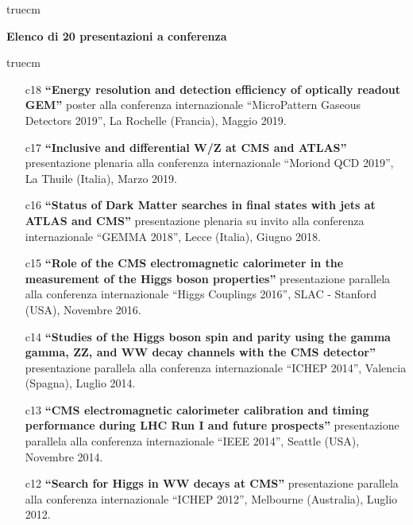 \documentclass[11pt,twoside,a4paper]{article}
\begin{document}
 truecm
\begin{center}
{\bf{Elenco di 20 presentazioni a conferenza}}
\end{center}
 truecm

\begin{enumerate}

\item [c18] {\bf ``Energy resolution and detection efficiency of
  optically readout GEM''} poster alla conferenza internazionale
  ``MicroPattern Gaseous Detectors 2019'', La Rochelle (Francia),
  Maggio 2019.
  \vspace{2mm}

\item[c17] {\bf ``Inclusive and differential W/Z at CMS and ATLAS''}
  presentazione plenaria alla conferenza internazionale ``Moriond QCD
  2019'', La Thuile (Italia), Marzo 2019.
  \vspace{2mm}

\item[c16] {\bf ``Status of Dark Matter searches in final states with
  jets at ATLAS and CMS''} presentazione plenaria su invito alla
  conferenza internazionale ``GEMMA 2018'', Lecce (Italia), Giugno 2018.
  \vspace{2mm}

\item[c15] {\bf ``Role of the CMS electromagnetic calorimeter in the
  measurement of the Higgs boson properties''} presentazione parallela
  alla conferenza internazionale ``Higgs Couplings 2016'', SLAC -
  Stanford (USA), Novembre 2016.
  \vspace{2mm}

\item[c14] {\bf ``Studies of the Higgs boson spin and parity using
  the gamma gamma, ZZ, and WW decay channels with the CMS detector''}
  presentazione parallela alla conferenza internazionale ``ICHEP
  2014'', Valencia (Spagna), Luglio 2014.
  \vspace{2mm}

\item[c13] {\bf ``CMS electromagnetic calorimeter calibration and
  timing performance during LHC Run I and future prospects''}
  presentazione parallela alla conferenza internazionale ``IEEE
  2014'', Seattle (USA), Novembre 2014.
  \vspace{2mm}

\item[c12] {\bf ``Search for Higgs in WW decays at CMS''}
  presentazione parallela alla conferenza internazionale ``ICHEP
  2012'', Melbourne (Australia), Luglio 2012.
  \vspace{2mm}


\end{enumerate}
\end{document}
